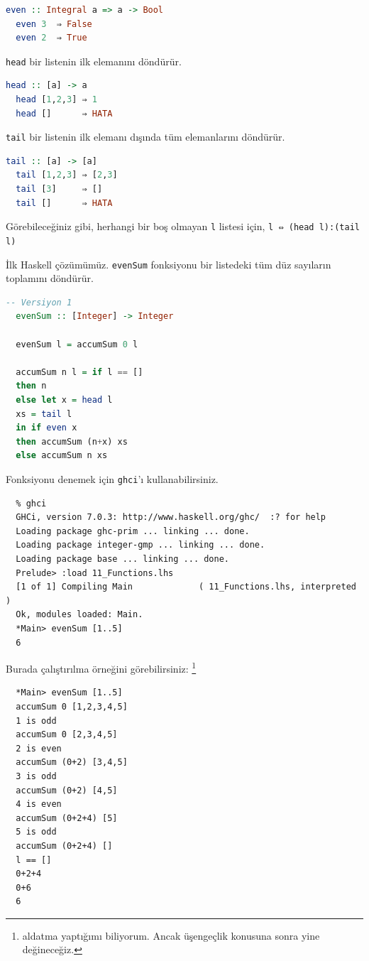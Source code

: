 \documentclass[a4paper,14pt,openany]{extbook} %
\begin{document}
\begin{lstlisting}[language=Haskell]
  even :: Integral a => a -> Bool
  even 3  ⇒ False
  even 2  ⇒ True
\end{lstlisting}

\lstinline!head! bir listenin ilk elemanını döndürür.

\begin{lstlisting}[language=Haskell]
  head :: [a] -> a
  head [1,2,3] ⇒ 1
  head []      ⇒ HATA
\end{lstlisting}

\lstinline!tail! bir listenin ilk elemanı dışında %
tüm elemanlarını döndürür.

\begin{lstlisting}[language=Haskell]
  tail :: [a] -> [a]
  tail [1,2,3] ⇒ [2,3]
  tail [3]     ⇒ []
  tail []      ⇒ HATA
\end{lstlisting}

Görebileceğiniz gibi, herhangi bir boş olmayan \lstinline!l! listesi
için, \lstinline!l ⇔ (head l):(tail l)!

İlk Haskell çözümümüz. \lstinline!evenSum! fonksiyonu bir listedeki tüm
düz sayıların toplamını döndürür.

\begin{lstlisting}[language=Haskell]
  -- Versiyon 1
  evenSum :: [Integer] -> Integer

  evenSum l = accumSum 0 l

  accumSum n l = if l == []
  then n
  else let x = head l
  xs = tail l
  in if even x
  then accumSum (n+x) xs
  else accumSum n xs
\end{lstlisting}

Fonksiyonu denemek için \lstinline!ghci!'ı kullanabilirsiniz.

\begin{lstlisting}
  % ghci
  GHCi, version 7.0.3: http://www.haskell.org/ghc/  :? for help
  Loading package ghc-prim ... linking ... done.
  Loading package integer-gmp ... linking ... done.
  Loading package base ... linking ... done.
  Prelude> :load 11_Functions.lhs
  [1 of 1] Compiling Main             ( 11_Functions.lhs, interpreted )
  Ok, modules loaded: Main.
  *Main> evenSum [1..5]
  6
\end{lstlisting}

Burada çalıştırılma örneğini görebilirsiniz: \footnote{aldatma %
  yaptığımı biliyorum. Ancak üşengeçlik konusuna sonra yine değineceğiz.}

\begin{lstlisting}
  *Main> evenSum [1..5]
  accumSum 0 [1,2,3,4,5]
  1 is odd
  accumSum 0 [2,3,4,5]
  2 is even
  accumSum (0+2) [3,4,5]
  3 is odd
  accumSum (0+2) [4,5]
  4 is even
  accumSum (0+2+4) [5]
  5 is odd
  accumSum (0+2+4) []
  l == []
  0+2+4
  0+6
  6
\end{lstlisting}
\end{document}
